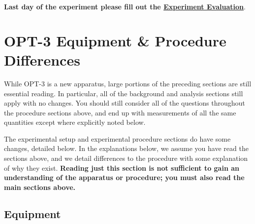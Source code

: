 \documentclass{../lab}
\begin{document}


\noindent\textbf{Last day of the experiment please fill out the \href{\ExperimentEvaluation}{\textbf{Experiment Evaluation}}}.

\section{OPT-3 Equipment \& Procedure Differences}
\label{sec:opt3equipment}

While OPT-3 is a new apparatus, large portions of the preceding sections are still essential reading. In particular, all of the background and analysis sections still apply with no changes. You should still consider all of the questions throughout the procedure sections above, and end up with measurements of all the same quantities except where explicitly noted below.

The experimental setup and experimental procedure sections do have some changes, detailed below. In the explanations below, we assume you have read the sections above, and we detail differences to the procedure with some explanation of why they exist. \textbf{Reading just this section is not sufficient to gain an understanding of the apparatus or procedure; you must also read the main sections above.}

\subsection{Equipment}
\end{document}
